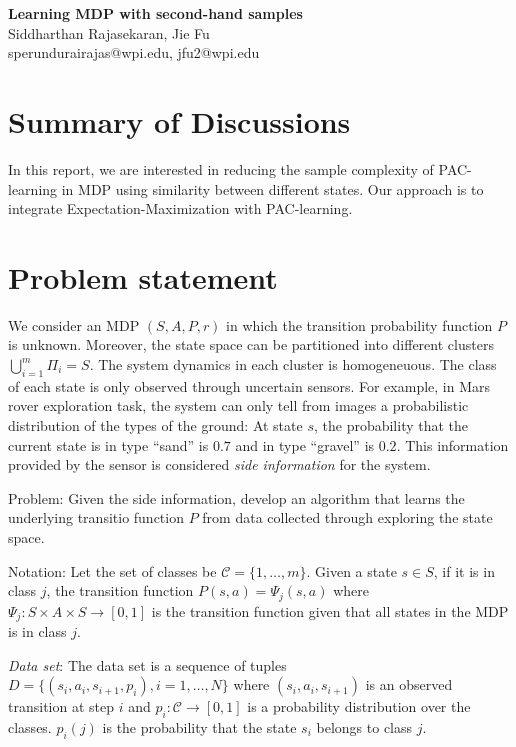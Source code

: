 \documentclass{article}[11pt]
\begin{document}
\begin{center}
\textbf{ \Large Learning MDP with second-hand samples}
\\
Siddharthan Rajasekaran, 
Jie Fu\\
 sperundurairajas@wpi.edu,
 jfu2@wpi.edu
\end{center}

\section{Summary of Discussions}
In this report, we are interested in reducing the sample complexity of
PAC-learning in MDP using similarity between different
states. Our approach is to integrate Expectation-Maximization with
PAC-learning.


\section{Problem statement}
We consider an MDP $(S,A, P, r)$ in which the transition probability
function $P$ is unknown. Moreover, the state space can be partitioned
into different clusters $\bigcup_{i=1}^m \Pi_i=S$. The system dynamics
in each cluster is homogeneuous. The class of each state is only
observed through uncertain sensors. For example, in Mars rover
exploration task, the system can only tell from images a probabilistic
distribution of the types of the ground: At state $s$, the probability
that the current state is in type ``sand'' is $0.7$ and in type
``gravel'' is $0.2$. This information provided by the sensor is
considered \emph{side information} for the system. 

Problem: Given the side information, develop an algorithm that learns
the underlying transitio function $P$ from data collected through
exploring the state space.


Notation: Let the set of classes be $\mathcal{C} = \{1,\ldots,m\}$. Given a
state $s\in S$, if it is in class $j$, the transition function
$P(s,a) = \Psi_j(s,a)$ where
$\Psi_j :S\times A\times S\rightarrow[0,1]$ is the transition function
given that all states in the MDP is in class $j$.

\emph{Data set}: The data set is a sequence of tuples
$D =  \{(s_i, a_i, s_{i+1}, p_i),i=1,\ldots, N\}$ where
$(s_i,a_i, s_{i+1})$ is an observed transition at step $i$ and
$p_i: \mathcal{C} \rightarrow [0,1]$ is a probability distribution
over the classes. $p_i(j)$ is the probability that the state $s_i$
belongs to class $j$. 
\end{document}
